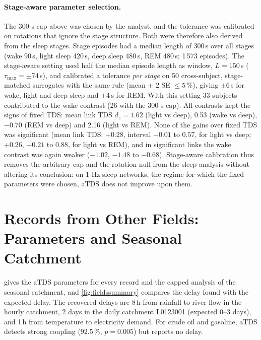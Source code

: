 \documentclass[11pt,a4paper]{article}
\begin{document}
\paragraph{Stage-aware parameter selection.}
\label{sec:res-stage}
The 300-s cap above was chosen by the analyst, and the tolerance was calibrated on rotations that ignore the stage structure. Both were therefore also derived from the sleep stages. Stage episodes had a median length of 300\,s over all stages (wake 90\,s, light sleep 420\,s, deep sleep 480\,s, REM 480\,s; 1\,573 episodes). The stage-aware setting used half the median episode length as window, $L = 150$\,s ($\tau_{\max} = \pm74$\,s), and calibrated a tolerance \emph{per stage} on 50 cross-subject, stage-matched surrogates with the same rule (mean + 2 SE $\le 5$\,\%), giving $\pm6$\,s for wake, light and deep sleep and $\pm4$\,s for REM. With this setting 33 subjects contributed to the wake contrast (26 with the 300-s cap). All contrasts kept the signs of fixed TDS: mean link TDS $d_z = 1.62$ (light vs deep), 0.53 (wake vs deep), $-0.70$ (REM vs deep) and 2.16 (light vs REM). None of the gains over fixed TDS was significant (mean link TDS: $+0.28$, interval $-0.01$ to $0.57$, for light vs deep; $+0.26$, $-0.21$ to $0.88$, for light vs REM), and in significant links the wake contrast was again weaker ($-1.02$, $-1.48$ to $-0.68$). Stage-aware calibration thus removes the arbitrary cap and the rotation null from the sleep analysis without altering its conclusion: on 1-Hz sleep networks, the regime for which the fixed parameters were chosen, aTDS does not improve upon them.

\section{Records from Other Fields: Parameters and Seasonal Catchment}
\label{app:seasonal}
 gives the aTDS parameters for every record and the capped analysis of the seasonal catchment, and \cref{fig:fieldssummary} compares the delay found with the expected delay. The recovered delays are 8\,h from rainfall to river flow in the hourly catchment, 2 days in the daily catchment L0123001 (expected 0--3 days), and 1\,h from temperature to electricity demand. For crude oil and gasoline, aTDS detects strong coupling (92.5\,\%, $p = 0.005$) but reports no delay.
\end{document}
